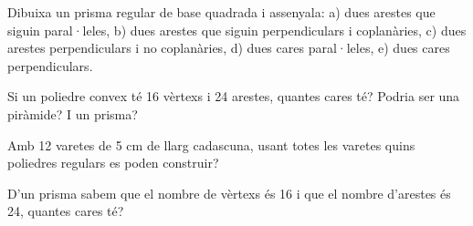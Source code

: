 \begin{activitats}
\begin{mylist}
\exer  Dibuixa un prisma regular de base quadrada i assenyala: a) dues arestes que siguin paral·leles, b) dues arestes que siguin perpendiculars i coplanàries, c) dues arestes perpendiculars i no coplanàries, d) dues cares paral·leles, e) dues cares perpendiculars.

\exer  Si un poliedre convex té 16 vèrtexs i 24 arestes, quantes cares té? Podria ser una piràmide? I un prisma?

\exer  Amb 12 varetes de 5 cm de llarg cadascuna, usant totes les varetes quins poliedres regulars es poden construir?

\exer  D'un prisma sabem que el nombre de vèrtexs és 16 i que el nombre d'arestes és 24, quantes cares té?


\end{mylist}
\end{activitats}
